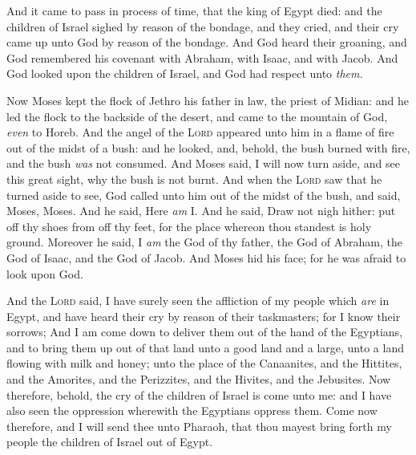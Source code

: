 \documentclass[11pt,letterpaper,oneside]{memoir}
\begin{document}
And it came to pass in process of time, that the king of Egypt died: and
the children of Israel sighed by reason of the bondage, and they cried,
and their cry came up unto God by reason of the bondage. And God heard
their groaning, and God remembered his covenant with Abraham, with
Isaac, and with Jacob. And God looked upon the children of Israel, and
God had respect unto \emph{them.}

Now Moses kept the flock of Jethro his father in law, the priest of
Midian: and he led the flock to the backside of the desert, and came to
the mountain of God, \emph{even} to Horeb. And the angel of the
\textsc{Lord} appeared unto him in a flame of fire out of the midst of a
bush: and he looked, and, behold, the bush burned with fire, and the
bush \emph{was} not consumed. And Moses said, I will now turn aside, and
see this great sight, why the bush is not burnt. And when the
\textsc{Lord} saw that he turned aside to see, God called unto him out
of the midst of the bush, and said, Moses, Moses. And he said, Here
\emph{am} I. And he said, Draw not nigh hither: put off thy shoes from
off thy feet, for the place whereon thou standest is holy ground.
Moreover he said, I \emph{am} the God of thy father, the God of Abraham,
the God of Isaac, and the God of Jacob. And Moses hid his face; for he
was afraid to look upon God.

And the \textsc{Lord} said, I have surely seen the affliction of my
people which \emph{are} in Egypt, and have heard their cry by reason of
their taskmasters; for I know their sorrows; And I am come down to
deliver them out of the hand of the Egyptians, and to bring them up out
of that land unto a good land and a large, unto a land flowing with milk
and honey; unto the place of the Canaanites, and the Hittites, and the
Amorites, and the Perizzites, and the Hivites, and the Jebusites. Now
therefore, behold, the cry of the children of Israel is come unto me:
and I have also seen the oppression wherewith the Egyptians oppress
them. Come now therefore, and I will send thee unto Pharaoh, that thou
mayest bring forth my people the children of Israel out of Egypt.
\end{document}
